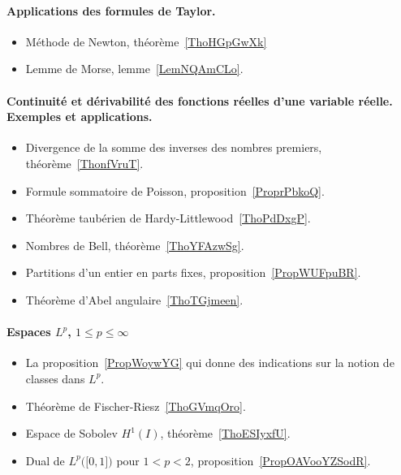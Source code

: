 \paragraph{Applications des formules de Taylor.}
\begin{itemize}
    \item Méthode de Newton, théorème~\ref{ThoHGpGwXk}
    \item Lemme de Morse, lemme~\ref{LemNQAmCLo}.
\end{itemize}
\paragraph{Continuité et dérivabilité des fonctions réelles d'une variable réelle. Exemples et applications.}
\begin{itemize}
    \item Divergence de la somme des inverses des nombres premiers, théorème~\ref{ThonfVruT}.
    \item Formule sommatoire de Poisson, proposition~\ref{ProprPbkoQ}.
    \item Théorème taubérien de Hardy-Littlewood~\ref{ThoPdDxgP}.
    \item Nombres de Bell, théorème~\ref{ThoYFAzwSg}.
    \item Partitions d'un entier en parts fixes, proposition~\ref{PropWUFpuBR}.
    \item Théorème d'Abel angulaire~\ref{ThoTGjmeen}.
\end{itemize}
\paragraph{Espaces \( L^p\), \( 1\leq p\leq\infty\)}
\begin{itemize}
    \item La proposition~\ref{PropWoywYG} qui donne des indications sur la notion de classes dans \( L^p\).
    \item Théorème de Fischer-Riesz~\ref{ThoGVmqOro}.
    \item Espace de Sobolev \( H^1(I)\), théorème~\ref{ThoESIyxfU}.
    \item Dual de \( L^p\big( \mathopen[ 0 , 1 \mathclose] \big)\) pour \( 1<p<2\), proposition~\ref{PropOAVooYZSodR}.
\end{itemize}
